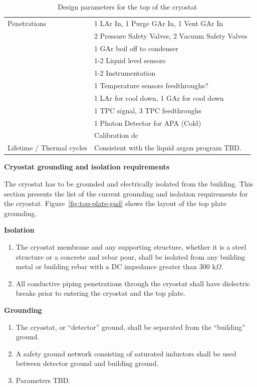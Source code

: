 \begin{table}[htpb]
\begin{tabular}{|p{}|p{}|}
Penetrations  &  1 LAr In, 1 Purge GAr In, 1 Vent GAr In \\ 
& 2 Pressure Safety Valves, 2 Vacuum Safety Valves \\ 
& 1 GAr boil off to condenser \\ 
& 1-2 Liquid level sensors \\ 
& 1-2 Instrumentation \\ 
& 1 Temperature sensors feedthroughs? \\ 
& 1 LAr for cool down, 1 GAr for cool down \\ 
& 1 TPC signal, 3 TPC feedthroughs \\
& 1 Photon Detector for APA (Cold) \\
& Calibration dc\\ \hline
Lifetime / Thermal cycles  & Consistent with the liquid argon program TBD. \\ \hline
\end{tabular}
\caption{Design parameters for the top of the cryostat}
\end{table}

\textbf{Cryostat grounding and isolation requirements}

The cryostat has to be grounded and electrically isolated from the building. 
This section presents the list of the current grounding and isolation requirements for the cryostat. 
Figure~\ref{fig:top-plate-gnd} shows the layout of the top plate grounding.

\textbf{Isolation}
\begin{enumerate}
\item The cryostat membrane and any supporting structure, whether it is a steel structure or a concrete and rebar pour, shall be isolated from any building metal or building rebar with a DC impedance greater than 300 k$\Omega$.
\item All conductive piping penetrations through the cryostat shall have dielectric breaks prior to entering the cryostat and the top plate.
\end{enumerate}

\textbf{Grounding}
\begin{enumerate}
\item The cryostat, or ``detector'' ground, shall be separated from the ``building'' ground.
\item A safety ground network consisting of saturated inductors shall be used between detector ground and building ground.
\item Parameters TBD.
\end{enumerate}

